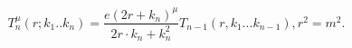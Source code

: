 \begin{equation}
T_{n}^{\mu}(r;k_{1}..k_{n})=\frac{e(2r+k_{n})^{\mu}}{2r\cdot k_{n}+k_{n}^{2}%
}T_{n-1}(r,k_{1}...k_{n-1}),r^{2}=m^{2}.
\end{equation}


